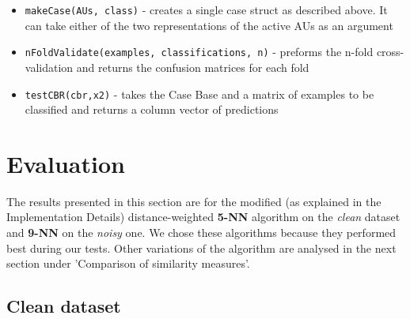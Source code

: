 \documentclass[a4paper]{article}
\begin{document}
\begin{itemize}
\item \texttt{makeCase(AUs, class)} - creates a single case struct as described above. It can take either of the two representations of the active AUs as an argument
\item \texttt{nFoldValidate(examples, classifications, n)} - preforms the n-fold cross-validation and returns the confusion matrices for each fold
\item \texttt{testCBR(cbr,x2)} - takes the Case Base and a matrix of examples to be classified and returns a column vector of predictions
\end{itemize}
\clearpage


\section{Evaluation}
The results presented in this section are for the modified (as explained in the Implementation Details) distance-weighted \textbf{5-NN} algorithm on the \emph{clean} dataset and \textbf{9-NN} on the \emph{noisy} one. We chose these algorithms because they performed best during our tests. Other variations of the algorithm are analysed in the next section under 'Comparison of similarity measures'.

\subsection{Clean dataset}
\end{document}

